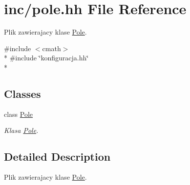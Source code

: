 \hypertarget{pole_8hh}{\section{inc/pole.hh File Reference}
\label{pole_8hh}
}


Plik zawierajacy klase \hyperlink{class_pole}{Pole}.  


{\ttfamily \#include $<$cmath$>$}\\*
{\ttfamily \#include \char`\"{}konfiguracja.\+hh\char`\"{}}\\*
\subsection*{Classes}
\begin{DoxyCompactItemize}
\item 
class \hyperlink{class_pole}{Pole}
\begin{DoxyCompactList}\small\item\em Klasa \hyperlink{class_pole}{Pole}. \end{DoxyCompactList}\end{DoxyCompactItemize}


\subsection{Detailed Description}
Plik zawierajacy klase \hyperlink{class_pole}{Pole}. 

